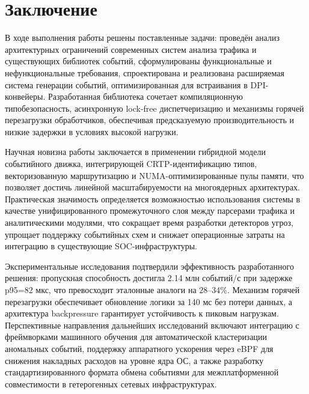 
\section*{Заключение}
В ходе выполнения работы решены поставленные задачи: проведён анализ архитектурных ограничений современных систем анализа трафика и существующих библиотек событий, сформулированы функциональные и нефункциональные требования, спроектирована и реализована расширяемая система генерации событий, оптимизированная для встраивания в DPI-конвейеры. Разработанная библиотека сочетает компиляционную типобезопасность, асинхронную lock-free диспетчеризацию и механизмы горячей перезагрузки обработчиков, обеспечивая предсказуемую производительность и низкие задержки в условиях высокой нагрузки.

Научная новизна работы заключается в применении гибридной модели событийного движка, интегрирующей CRTP-идентификацию типов, векторизованную маршрутизацию и NUMA-оптимизированные пулы памяти, что позволяет достичь линейной масштабируемости на многоядерных архитектурах. Практическая значимость определяется возможностью использования системы в качестве унифицированного промежуточного слоя между парсерами трафика и аналитическими модулями, что сокращает время разработки детекторов угроз, упрощает поддержку событийных схем и снижает операционные затраты на интеграцию в существующие SOC-инфраструктуры.

Экспериментальные исследования подтвердили эффективность разработанного решения: пропускная способность достигла 2.14 млн событий/с при задержке p95=82 мкс, что превосходит эталонные аналоги на 28–34\%. Механизм горячей перезагрузки обеспечивает обновление логики за 140 мс без потери данных, а архитектура backpressure гарантирует устойчивость к пиковым нагрузкам. Перспективные направления дальнейших исследований включают интеграцию с фреймворками машинного обучения для автоматической кластеризации аномальных событий, поддержку аппаратного ускорения через eBPF для снижения накладных расходов на уровне ядра ОС, а также разработку стандартизированного формата обмена событиями для межплатформенной совместимости в гетерогенных сетевых инфраструктурах.

\newpage